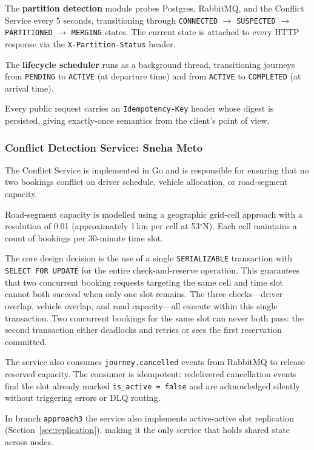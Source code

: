 \documentclass[12pt,a4paper]{article}
\begin{document}
The \textbf{partition detection} module probes Postgres, RabbitMQ, and the Conflict Service every 5 seconds, transitioning through \texttt{CONNECTED} $\rightarrow$ \texttt{SUSPECTED} $\rightarrow$ \texttt{PARTITIONED} $\rightarrow$ \texttt{MERGING} states. The current state is attached to every HTTP response via the \texttt{X-Partition-Status} header.
 
The \textbf{lifecycle scheduler} runs as a background thread, transitioning journeys from \texttt{PENDING} to \texttt{ACTIVE} (at departure time) and from \texttt{ACTIVE} to \texttt{COMPLETED} (at arrival time).

Every public request carries an \texttt{Idempotency-Key} header whose digest is persisted, giving exactly-once semantics from the client's point of view.
 
\subsubsection{Conflict Detection Service: Sneha Meto}
 
The Conflict Service is implemented in Go and is responsible for ensuring that no two bookings conflict on driver schedule, vehicle allocation, or road-segment capacity.
 
Road-segment capacity is modelled using a geographic grid-cell approach with a resolution of 0.01\textdegree{} (approximately 1\,km per cell at 53$^\circ$N). Each cell maintains a count of bookings per 30-minute time slot.
 
The core design decision is the use of a single \texttt{SERIALIZABLE} transaction with \texttt{SELECT FOR UPDATE} for the entire check-and-reserve operation. This guarantees that two concurrent booking requests targeting the same cell and time slot cannot both succeed when only one slot remains. The three checks---driver overlap, vehicle overlap, and road capacity---all execute within this single transaction. Two concurrent bookings for the same slot can never both pass: the second transaction either deadlocks and retries or sees the first reservation committed.
 
The service also consumes \texttt{journey.cancelled} events from RabbitMQ to release reserved capacity. The consumer is idempotent: redelivered cancellation events find the slot already marked \texttt{is\_active = false} and are acknowledged silently without triggering errors or DLQ routing.

In branch \texttt{approach3} the service also implements active-active slot replication (Section~\ref{sec:replication}), making it the only service that holds shared state across nodes.
 
\end{document}
